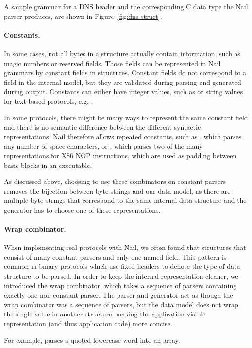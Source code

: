 A sample grammar for a DNS header and the corresponding C data type the Nail parser produces, are
shown in Figure~\ref{fig:dns-struct}.

\paragraph{Constants.}
In some cases, not all bytes in a structure actually contain information, such as magic numbers or
reserved fields. Those fields can be represented in Nail grammars by constant fields in structures.
Constant fields do not correspond to a field in the internal model, but they are validated during
parsing and generated during output.  Constants can either have integer values, such as
 or string values for text-based protocols, e.g. .

In some protocols, there might be many ways to represent the same constant field
and there is no semantic difference between the different syntactic representations.
Nail therefore allows repeated constants, such as , which parses any number of space characters, or
, which parses two of the many representations for X86
NOP instructions, which are used as padding between basic blocks in an executable. 

As discussed above, choosing to use these combinators on constant parsers
removes the bijection between byte-strings and our data model, as there are
multiple byte-strings that correspond to the same internal data structure and
the generator has to choose one of these representations.
\paragraph{Wrap combinator.} 
When implementing real protocols with Nail, we often found that
structures that consist of many constant parsers and only one named field. This pattern is
common in binary protocols which use fixed headers to denote the type of data
structure to be parsed.  In order to keep the internal representation cleaner,
we introduced the wrap combinator, which takes a sequence of parsers containing
exactly one non-constant parser. The parser and generator act as though the wrap
combinator was a sequence of parsers, but the data model does not wrap the
single value in another structure, making the application-visible representation
(and thus application code) more concise.


For example,  parses a quoted
lowercase word into an array.

